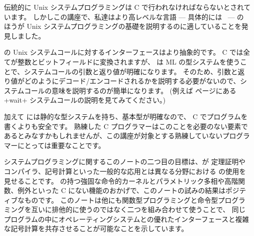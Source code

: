 伝統的に Unix システムプログラミングは C で行われなければならないとされています。
しかしこの講座で、私達はより高レベルな言語 --- 具体的には \ocaml\ --- のほうが Unix システムプログラミングの基礎を説明するのに適していることを発見しました。

\ocaml の Unix システムコールに対するインターフェースはより抽象的です。
C では全てが整数とビットフィールドに変換されますが、
\ocaml は ML の型システムを使うことで、システムコールの引数と返り値が明確になります。
そのため、引数と返り値がどのようにデコード/エンコードされるかを説明する必要がないので、システムコールの意味を説明するのが簡単になります。 (例えば \pageref{wait} ページにある \ml+wait+ システムコールの説明を見てみてください。)

加えて \ocaml には静的な型システムを持ち、基本型が明確なので、 C でプログラムを書くよりも安全です。
熟練した C プログラマーはこのことを必要のない要素であるとみなすかもしれませんが、この講座が対象とする熟練していないプログラマーにとっては重要なことです。

システムプログラミングに関するこのノートの二つ目の目標は、\ocaml が 定理証明やコンパイラ、記号計算といった一般的な応用とは異なる分野における \ocaml の使用を見せることです。
\ocaml の持つ強固な命令的カーネルとパラメトリック多相や高階関数、例外といった C にない機能のおかげで、このノートの試みの結果はポジティブなものです。
このノートは他にも関数型プログラミングと命令型プログラミングを互いに排他的に使うのではなく二つを組み合わせて使うことで、
同じプログラムの中にオペレーティングシステムとの優れたインターフェースと複雑な記号計算を共存させることが可能なことを示しています。

